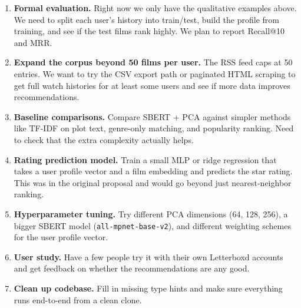 \documentclass[sigconf,nonacm]{acmart}
\begin{document}
\begin{enumerate}
  \item \textbf{Formal evaluation.} Right now we only have the qualitative examples above. We need to split each user's history into train/test, build the profile from training, and see if the test films rank highly. We plan to report Recall@10 and MRR.
  \item \textbf{Expand the corpus beyond 50 films per user.} The RSS feed caps at 50 entries. We want to try the CSV export path or paginated HTML scraping to get full watch histories for at least some users and see if more data improves recommendations.
  \item \textbf{Baseline comparisons.} Compare SBERT + PCA against simpler methods like TF-IDF on plot text, genre-only matching, and popularity ranking. Need to check that the extra complexity actually helps.
  \item \textbf{Rating prediction model.} Train a small MLP or ridge regression that takes a user profile vector and a film embedding and predicts the star rating. This was in the original proposal and would go beyond just nearest-neighbor ranking.
  \item \textbf{Hyperparameter tuning.} Try different PCA dimensions (64, 128, 256), a bigger SBERT model (\texttt{all-mpnet-base-v2}), and different weighting schemes for the user profile vector.
  \item \textbf{User study.} Have a few people try it with their own Letterboxd accounts and get feedback on whether the recommendations are any good.
  \item \textbf{Clean up codebase.} Fill in missing type hints and make sure everything runs end-to-end from a clean clone.
\end{enumerate}


\end{document}
